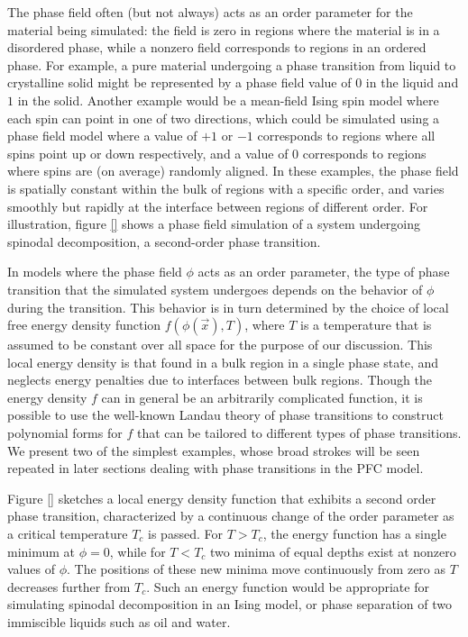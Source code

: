 \documentclass[a4paper]{article}
\begin{document}
The phase field often (but not always) acts as an order parameter for the material being simulated: the field is zero in regions where the material is in a disordered phase, while a nonzero field corresponds to regions in an ordered phase. For example, a pure material undergoing a phase transition from liquid to crystalline solid might be represented by a phase field value of $0$ in the liquid and $1$ in the solid. Another example would be a mean-field Ising spin model where each spin can point in one of two directions, which could be simulated using a phase field model where a value of $+1$ or $-1$ corresponds to regions where all spins point up or down respectively, and a value of $0$ corresponds to regions where spins are (on average) randomly aligned. In these examples, the phase field is spatially constant within the bulk of regions with a specific order, and varies smoothly but rapidly at the interface between regions of different order. For illustration, figure \ref{} shows a phase field simulation of a system undergoing spinodal decomposition, a second-order phase transition.

In models where the phase field $\phi$ acts as an order parameter, the type of phase transition that the simulated system undergoes depends on the behavior of $\phi$ during the transition. This behavior is in turn determined by the choice of local free energy density function $f(\phi(\vec{x}),T)$, where $T$ is a temperature that is assumed to be constant over all space for the purpose of our discussion. This local energy density is that found in a bulk region in a single phase state, and neglects energy penalties due to interfaces between bulk regions. Though the energy density $f$ can in general be an arbitrarily complicated function, it is possible to use the well-known Landau theory of phase transitions to construct polynomial forms for $f$ that can be tailored to different types of phase transitions. We present two of the simplest examples, whose broad strokes will be seen repeated in later sections dealing with phase transitions in the PFC model.

Figure \ref{} sketches a local energy density function that exhibits a second order phase transition, characterized by a continuous change of the order parameter as a critical temperature $T_c$ is passed. For $T>T_c$, the energy function has a single minimum at $\phi=0$, while for $T<T_c$ two minima of equal depths exist at nonzero values of $\phi$. The positions of these new minima move continuously from zero as $T$ decreases further from $T_c$. Such an energy function would be appropriate for simulating spinodal decomposition in an Ising model, or phase separation of two immiscible liquids such as oil and water.
\end{document}
